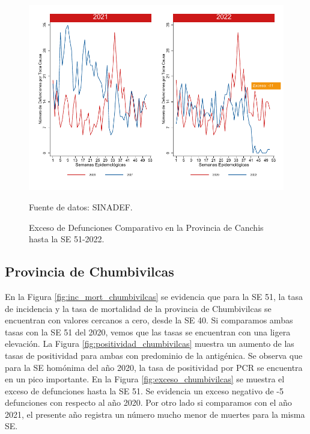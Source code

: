 \documentclass[12pt,a4paper,openany]{book}
\begin{document}
	\begin{figure}[h]
		\caption{Exceso de Defunciones Comparativo en la Provincia de Canchis hasta la SE 51-2022.}\label{fig:exceso_canchis}
		\begin{center}
			\includegraphics[width=0.7\linewidth]{../figuras/exceso_5.pdf}
		\end{center}
		{\footnotesize {Fuente de datos: SINADEF.}}
	\end{figure}
	
	\clearpage
	
	\subsection*{Provincia de Chumbivilcas}
	\noindent En la Figura \ref{fig:inc_mort_chumbivilcas} se evidencia que para la SE 51, la tasa de incidencia y la tasa de mortalidad de la provincia de Chumbivilcas se encuentran con valores cercanos a cero, desde la SE 40. Si comparamos ambas tasas con la SE 51 del 2020, vemos que las tasas se encuentran con una ligera elevación.
	\noindent La Figura \ref{fig:positividad_chumbivilcas} muestra un aumento de las tasas de positividad para  ambas con predominio de la antigénica. Se observa que para la SE homónima del año 2020, la tasa de positividad por PCR se encuentra en un pico importante.
	En la Figura \ref{fig:exceso_chumbivilcas} se muestra el exceso de defunciones hasta la SE 51. Se evidencia un exceso negativo de -5 defunciones con respecto al año 2020. Por otro lado si comparamos con el año 2021, el presente año registra un número mucho menor de muertes para la misma SE.
	
\end{document}
